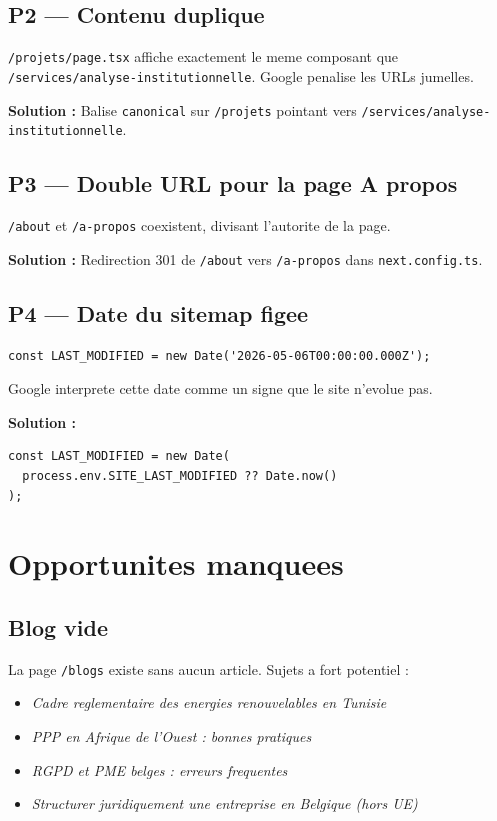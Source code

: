 \documentclass[12pt, a4paper]{article}
\newcommand{\f}[1]{\texttt{\small\color{rnjdark}#1}}
\begin{document}
\subsection{P2 --- Contenu duplique}

\f{/projets/page.tsx} affiche exactement le meme composant que
\f{/services/analyse-institutionnelle}. Google penalise les URLs jumelles.

\textbf{Solution :} Balise \texttt{canonical} sur \f{/projets} pointant vers
\f{/services/analyse-institutionnelle}.

\subsection{P3 --- Double URL pour la page A propos}

\f{/about} et \f{/a-propos} coexistent, divisant l'autorite de la page.

\textbf{Solution :} Redirection 301 de \f{/about} vers \f{/a-propos} dans
\f{next.config.ts}.

\subsection{P4 --- Date du sitemap figee}

\begin{verbatim}
const LAST_MODIFIED = new Date('2026-05-06T00:00:00.000Z');
\end{verbatim}

Google interprete cette date comme un signe que le site n'evolue pas.

\textbf{Solution :}
\begin{verbatim}
const LAST_MODIFIED = new Date(
  process.env.SITE_LAST_MODIFIED ?? Date.now()
);
\end{verbatim}

\section{Opportunites manquees}

\subsection{Blog vide}

La page \f{/blogs} existe sans aucun article. Sujets a fort potentiel :
\begin{itemize}[leftmargin=1.5em, topsep=4pt]
  \item \emph{Cadre reglementaire des energies renouvelables en Tunisie}
  \item \emph{PPP en Afrique de l'Ouest : bonnes pratiques}
  \item \emph{RGPD et PME belges : erreurs frequentes}
  \item \emph{Structurer juridiquement une entreprise en Belgique (hors UE)}
\end{itemize}
\end{document}
